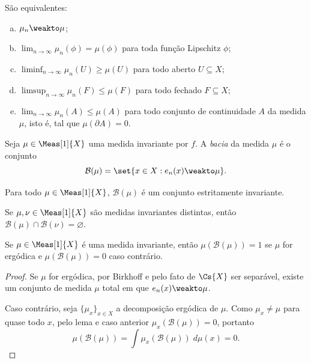 \documentclass[../fapesp0]{subfiles}
\begin{document}
\begin{proposition}[Portmanteau]\label{prop:portmanteau}
  São equivalentes:
  \begin{enumerate}[a), left=0pt, topsep=3pt]
    \item \(\mu_n \weakto \mu\);
    \item \(\lim_{n \to \infty} \mu_n(\phi) = \mu(\phi)\) para toda função Lipschitz \(\phi\);
    \item \(\liminf_{n \to \infty} \mu_n(U) \geq \mu(U)\) para todo aberto \(U \subseteq X\);
    \item \(\limsup_{n \to \infty} \mu_n(F) \leq \mu(F)\) para todo fechado \(F \subseteq X\);
    \item \(\lim_{n \to \infty} \mu_n(A) \leq \mu(A)\) para todo conjunto de continuidade \(A\) da medida \(\mu\), isto é, tal que \(\mu(\partial A) = 0\).
  \end{enumerate}
\end{proposition}

\begin{definition}
  Seja \(\mu \in \Meas[1]{X}\) uma medida invariante por \(f\). A \emph{bacia} da medida \(\mu\) é o conjunto
  \begin{equation*}
    \mathcal{B}(\mu) = \set{ x \in X : e_n(x) \weakto \mu }.
  \end{equation*}
\end{definition}

\begin{lemma}
  Para todo \(\mu \in \Meas[1]{X}\), \(\mathcal{B}(\mu)\) é um conjunto estritamente invariante.
\end{lemma}

\begin{lemma}\label{lem:basins-disjoint}
  Se \(\mu, \nu \in \Meas[1]{X}\) são medidas invariantes distintas, então \(\mathcal{B}(\mu) \cap \mathcal{B}(\nu) = \varnothing\).
\end{lemma}

\begin{corollary}
  Se \(\mu \in \Meas[1]{X}\) é uma medida invariante, então \(\mu(\mathcal{B}(\mu)) = 1\) se \(\mu\) for ergódica e \(\mu(\mathcal{B}(\mu)) = 0\) caso contrário.
\end{corollary}

\begin{proof}
  Se \(\mu\) for ergódica, por Birkhoff e pelo fato de \(\Cs{X}\) ser separável, existe um conjunto de medida \(\mu\) total em que \(e_n(x) \weakto \mu\).

  Caso contrário, seja \(\{ \mu_x \}_{x \in X}\) a decomposição ergódica de \(\mu\). Como \(\mu_x \neq \mu\) para quase todo \(x\), pelo lema e caso anterior \(\mu_x(\mathcal{B}(\mu)) = 0\), portanto
  \begin{equation*}
    \mu(\mathcal{B}(\mu)) = \int \mu_x(\mathcal{B}(\mu)) \;d\mu(x) = 0.
  \end{equation*}
  
\end{proof}
\end{document}
